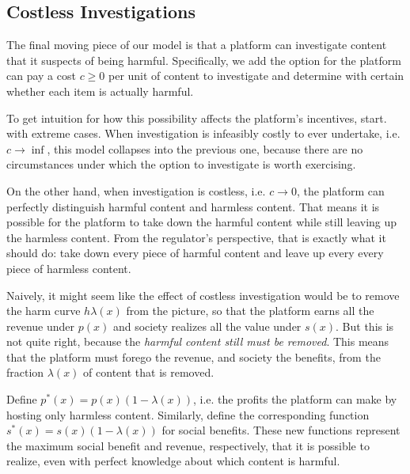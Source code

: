 \subsection{Costless Investigations}
\label{sec:costless}

The final moving piece of our model is that a platform can investigate content that it suspects of being harmful. Specifically, we add the option for the platform can pay a cost $c \ge 0$  per unit of content to investigate and determine with certain whether each item is actually harmful.

To get intuition for how this possibility affects the platform's incentives, start. with extreme cases. When investigation is infeasibly costly to ever undertake, i.e. $c \to \inf$, this model collapses into the previous one, because there are no circumstances under which the option to investigate is worth exercising.

On the other hand, when investigation is costless, i.e. $c \to 0$, the platform can perfectly distinguish harmful content and harmless content. That means it is possible for the platform to take down the harmful content while still leaving up the harmless content. From the regulator's perspective, that is exactly what it should do: take down every piece of harmful content and leave up every every piece of harmless content. 

Naively, it might seem like the effect of costless investigation would be to remove the harm curve $h\lambda(x)$ from the picture, so that the platform earns all the revenue under $p(x)$ and society realizes all the value under $s(x)$. But this is not quite right, because the \emph{harmful content still must be removed}. This means that the platform must forego the revenue, and society the benefits, from the fraction $\lambda(x)$ of content that is removed.

Define $p^*(x) = p(x)(1 - \lambda(x))$, i.e. the profits the platform can make by hosting only harmless content. Similarly, define the corresponding function $s^*(x) = s(x)(1 - \lambda(x))$ for social benefits. These new functions represent the maximum social benefit and revenue, respectively, that it is possible to realize, even with perfect knowledge about which content is harmful.

